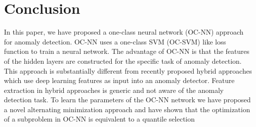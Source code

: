 \section{Conclusion}
\label{sec:ocnn_conclusion}
In this paper, we have proposed a one-class neural network (OC-NN) approach for anomaly detection.
OC-NN uses a one-class SVM (OC-SVM) like loss function to train a neural network.
The advantage of OC-NN is that the features of the hidden layers are constructed for the specific
task of anomaly detection. This approach is substantially different from recently proposed
hybrid approaches which use deep learning features as input into an anomaly detector.  Feature
extraction in hybrid approaches is generic and not aware of the anomaly detection task. To learn
the parameters of the OC-NN network we have proposed a novel alternating minimization approach and
have shown that the optimization of a subproblem in OC-NN is equivalent to a quantile selection


